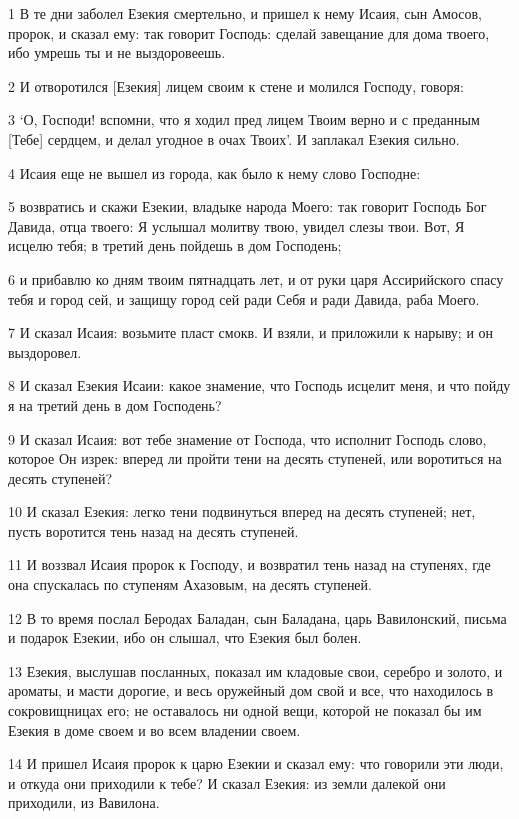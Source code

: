\par 1 В те дни заболел Езекия смертельно, и пришел к нему Исаия, сын Амосов, пророк, и сказал ему: так говорит Господь: сделай завещание для дома твоего, ибо умрешь ты и не выздоровеешь.
\par 2 И отворотился [Езекия] лицем своим к стене и молился Господу, говоря:
\par 3 `О, Господи! вспомни, что я ходил пред лицем Твоим верно и с преданным [Тебе] сердцем, и делал угодное в очах Твоих'. И заплакал Езекия сильно.
\par 4 Исаия еще не вышел из города, как было к нему слово Господне:
\par 5 возвратись и скажи Езекии, владыке народа Моего: так говорит Господь Бог Давида, отца твоего: Я услышал молитву твою, увидел слезы твои. Вот, Я исцелю тебя; в третий день пойдешь в дом Господень;
\par 6 и прибавлю ко дням твоим пятнадцать лет, и от руки царя Ассирийского спасу тебя и город сей, и защищу город сей ради Себя и ради Давида, раба Моего.
\par 7 И сказал Исаия: возьмите пласт смокв. И взяли, и приложили к нарыву; и он выздоровел.
\par 8 И сказал Езекия Исаии: какое знамение, что Господь исцелит меня, и что пойду я на третий день в дом Господень?
\par 9 И сказал Исаия: вот тебе знамение от Господа, что исполнит Господь слово, которое Он изрек: вперед ли пройти тени на десять ступеней, или воротиться на десять ступеней?
\par 10 И сказал Езекия: легко тени подвинуться вперед на десять ступеней; нет, пусть воротится тень назад на десять ступеней.
\par 11 И воззвал Исаия пророк к Господу, и возвратил тень назад на ступенях, где она спускалась по ступеням Ахазовым, на десять ступеней.
\par 12 В то время послал Беродах Баладан, сын Баладана, царь Вавилонский, письма и подарок Езекии, ибо он слышал, что Езекия был болен.
\par 13 Езекия, выслушав посланных, показал им кладовые свои, серебро и золото, и ароматы, и масти дорогие, и весь оружейный дом свой и все, что находилось в сокровищницах его; не оставалось ни одной вещи, которой не показал бы им Езекия в доме своем и во всем владении своем.
\par 14 И пришел Исаия пророк к царю Езекии и сказал ему: что говорили эти люди, и откуда они приходили к тебе? И сказал Езекия: из земли далекой они приходили, из Вавилона.
